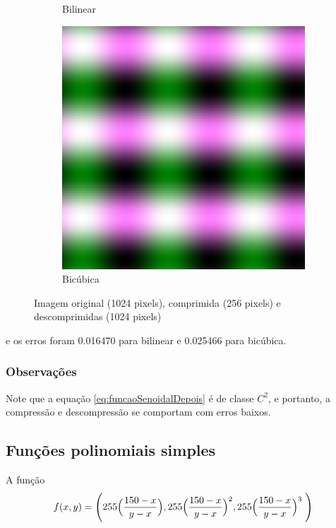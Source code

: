\documentclass{article}
\begin{document}
\begin{figure}[ht]
\begin{subfigure}{0.23\textwidth}
    \caption{Bilinear}
  \end{subfigure}%
  \hfill
  \begin{subfigure}{0.23\textwidth}
    \centering
    \includegraphics[width=\textwidth]{senoidal/h-10/decompressed-bicubica.png}
    \caption{Bicúbica}
  \end{subfigure}
  \caption{Imagem original (1024 pixels), comprimida (256 pixels) e descomprimidas (1024 pixels)}
\end{figure}

e os erros foram 0.016470 para bilinear e 0.025466 para bicúbica.

\subsubsection{Observações}

Note que a equação \ref{eq:funcaoSenoidalDepois} é de classe $C^2$,
e portanto, a compressão e descompressão se comportam com erros baixos.

\subsection{Funções polinomiais simples}

A função
\begin{equation}
  f(x,y) = \Biggl( 255 \Bigl(\dfrac{150-x}{y-x}\Bigr) , 255 \Bigl(\dfrac{150-x}{y-x}\Bigr)^2 , 255 \Bigl(\dfrac{150-x}{y-x}\Bigr)^3 \; \Biggr) \label{eq:funcaoPolinomial}
\end{equation}
\end{document}
